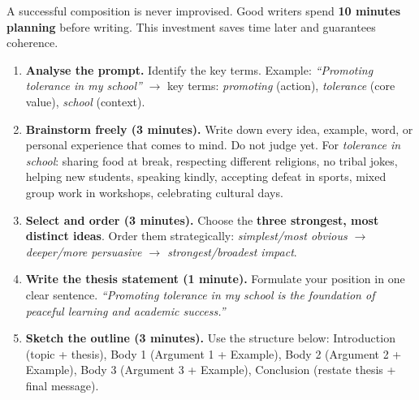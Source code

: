 \documentclass[11pt]{article}
\begin{document}
A successful composition is never improvised. Good writers spend \textbf{10 minutes planning} before writing. This investment saves time later and guarantees coherence.

\begin{methode}
\begin{enumerate}
\item \textbf{Analyse the prompt.} Identify the key terms. Example: \emph{``Promoting tolerance in my school''} $\rightarrow$ key terms: \emph{promoting} (action), \emph{tolerance} (core value), \emph{school} (context).
\item \textbf{Brainstorm freely (3 minutes).} Write down every idea, example, word, or personal experience that comes to mind. Do not judge yet. For \emph{tolerance in school}: sharing food at break, respecting different religions, no tribal jokes, helping new students, speaking kindly, accepting defeat in sports, mixed group work in workshops, celebrating cultural days.
\item \textbf{Select and order (3 minutes).} Choose the \textbf{three strongest, most distinct ideas}. Order them strategically: \emph{simplest/most obvious $\rightarrow$ deeper/more persuasive $\rightarrow$ strongest/broadest impact}.
\item \textbf{Write the thesis statement (1 minute).} Formulate your position in one clear sentence. \emph{``Promoting tolerance in my school is the foundation of peaceful learning and academic success.''}
\item \textbf{Sketch the outline (3 minutes).} Use the structure below: Introduction (topic + thesis), Body 1 (Argument 1 + Example), Body 2 (Argument 2 + Example), Body 3 (Argument 3 + Example), Conclusion (restate thesis + final message).
\end{enumerate}
\end{methode}
\end{document}
